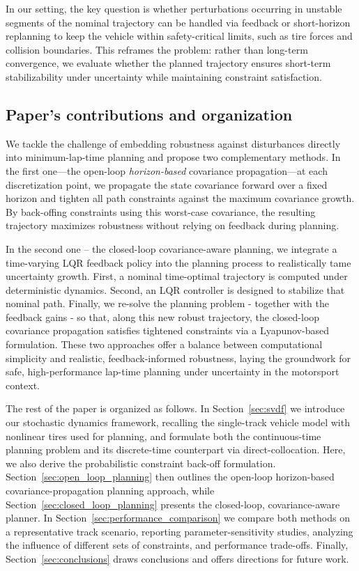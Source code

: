 In our setting, the key question is whether perturbations occurring in unstable segments of the nominal trajectory can be handled via feedback or short-horizon replanning to keep the vehicle within safety-critical limits, such as tire forces and collision boundaries. This reframes the problem: rather than long-term convergence, we evaluate whether the planned trajectory ensures short-term stabilizability under uncertainty while maintaining constraint satisfaction.



\subsection{Paper's contributions and organization}
We tackle the challenge of embedding robustness against disturbances directly into minimum-lap-time planning and propose two complementary methods. In the first one---the open-loop \emph{horizon-based} covariance propagation---at each discretization point, we propagate the state covariance forward over a fixed horizon and tighten all path constraints against the maximum covariance growth. By back-offing constraints using this worst-case covariance, the resulting trajectory maximizes robustness without relying on feedback during planning.

In the second one -- the closed-loop covariance-aware planning, we integrate a time-varying LQR feedback policy into the planning process to realistically tame uncertainty growth. First, a nominal time-optimal trajectory is computed under deterministic dynamics. Second, an LQR controller is designed to stabilize that nominal path. Finally, we re-solve the planning problem - together with the feedback gains - so that, along this new robust trajectory, the closed-loop covariance propagation satisfies tightened constraints via a Lyapunov-based formulation. These two approaches offer a balance between computational simplicity and realistic, feedback-informed robustness, laying the groundwork for safe, high-performance lap-time planning under uncertainty in the motorsport context.

The rest of the paper is organized as follows. 
In Section~\ref{sec:svdf} we introduce our stochastic dynamics framework, recalling the single-track vehicle model with nonlinear tires used for planning, and formulate both the continuous-time planning problem and its discrete-time counterpart via direct-collocation. Here, we also derive the probabilistic constraint back-off formulation.
Section~\ref{sec:open_loop_planning} then outlines the open-loop horizon-based covariance-propagation planning approach, while Section~\ref{sec:closed_loop_planning} presents the closed-loop, covariance-aware planner. In Section~\ref{sec:performance_comparison} we compare both methods on a representative track scenario, reporting parameter-sensitivity studies, analyzing the influence of different sets of constraints, and performance trade-offs. 
Finally, Section~\ref{sec:conclusions} draws conclusions and offers directions for future work.
  